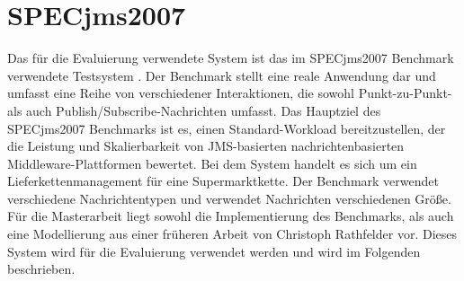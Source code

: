 
\section{SPECjms2007}
\label{sec:specjms}
Das für die Evaluierung verwendete System ist das im SPECjms2007 Benchmark verwendete Testsystem \cite{Sachs2013}. Der Benchmark stellt eine reale Anwendung dar und umfasst eine Reihe von verschiedener Interaktionen, die sowohl Punkt-zu-Punkt- als auch Publish/Subscribe-Nachrichten umfasst. Das Hauptziel des SPECjms2007 Benchmarks ist es, einen Standard-Workload bereitzustellen, der die Leistung und Skalierbarkeit von JMS-basierten nachrichtenbasierten Middleware-Plattformen bewertet. Bei dem System handelt es sich um ein Lieferkettenmanagement für eine Supermarktkette. Der Benchmark verwendet verschiedene Nachrichtentypen und verwendet Nachrichten verschiedenen Größe. Für die Masterarbeit liegt sowohl die Implementierung des Benchmarks, als auch eine Modellierung aus einer früheren Arbeit von Christoph Rathfelder \cite{Rathfelder2013} vor. Dieses System wird für die Evaluierung verwendet werden und wird im Folgenden beschrieben. 

